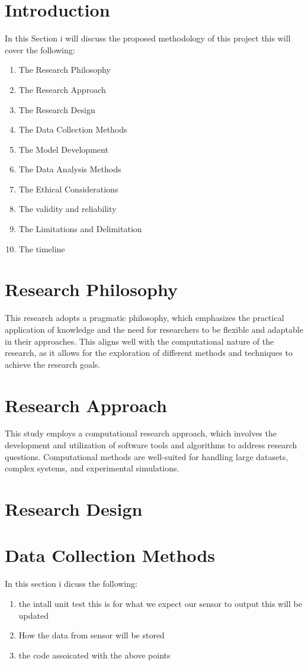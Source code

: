
\section{Introduction}
In this  Section  i will discuss the  proposed  methodology of this  project this will cover the  following:
\begin{enumerate}
    \item The Research Philosophy
    \item The Research Approach
    \item The Research Design
    \item The Data Collection Methods
    \item The Model Development
    \item The Data Analysis Methods
    \item The Ethical Considerations
    \item The validity and reliability 
    \item The Limitations and Delimitation
    \item The timeline
\end{enumerate} 
\section{Research Philosophy}

This research adopts a pragmatic philosophy, which emphasizes the practical application of knowledge and the need for researchers to be flexible and adaptable in their approaches. This aligns well with the computational nature of the research, as it allows for the exploration of different methods and techniques to achieve the research goals.

\section{Research Approach}

This study employs a computational research approach, which involves the development and utilization of software tools and algorithms to address research questions. Computational methods are well-suited for handling large datasets, complex systems, and experimental simulations.

\section{Research Design}

\section{Data Collection Methods}
In this section  i dicuss the  following:
\begin{enumerate}
    \item the  intall  unit test this is for  what we  expect  our  sensor  to  output this  will  be  updated
    \item How  the data  from sensor will be stored 
    \item the code  assoicated   with the above points 
\end{enumerate}
